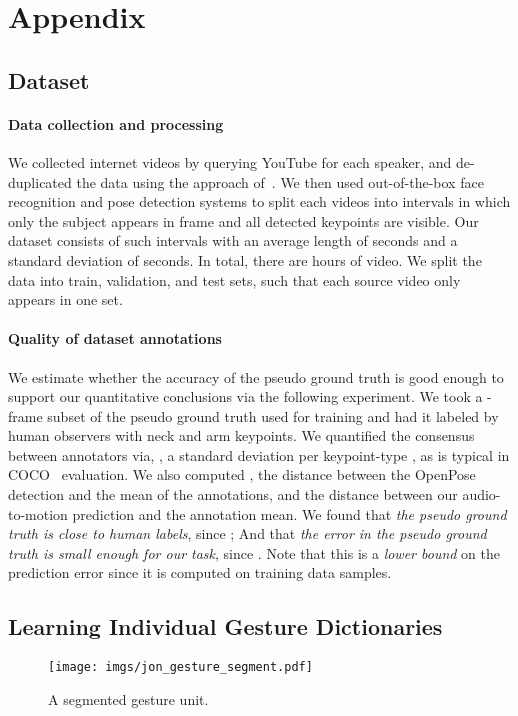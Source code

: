 \documentclass[10pt,twocolumn,letterpaper]{article}
\newcommand{\mypar}[1]{\vspace{-2mm}\paragraph{#1}}
\begin{document}
{\small


}

\section{Appendix}
\subsection{Dataset}
\paragraph{Data collection and processing}  We collected internet videos by querying YouTube for each speaker, and de-duplicated the data using the approach of~\cite{fouhey2017lifestyle}. We then used out-of-the-box face recognition and pose detection systems to split each videos into intervals in which only the subject appears in frame and all detected keypoints are visible. Our dataset consists of  such intervals with an average length of  seconds and a standard deviation of  seconds. In total, there are  hours of video. We split the data into  train,  validation, and  test sets, such that each source video only appears in one set.

\mypar{Quality of dataset annotations} We estimate whether the accuracy of the pseudo ground truth is good enough to support our quantitative conclusions via the following experiment.
We took a -frame subset of the pseudo ground truth used for training and had it labeled by  human observers with neck and arm keypoints. We quantified the consensus between annotators via, , a standard deviation per keypoint-type , as is typical in COCO~\cite{coco} evaluation. We also computed , the distance between the OpenPose detection and the mean of the annotations, and  the distance between our audio-to-motion prediction and the annotation mean. We found that \emph{the pseudo ground truth is close to human labels}, since ; And that \emph{the error in the pseudo ground truth is small enough for our task}, since . Note that this is a \emph{lower bound} on the prediction error since it is computed on training data samples.











\subsection{Learning Individual Gesture Dictionaries}
\begin{figure}
  \centering \texttt{[image: imgs/jon\_gesture\_segment.pdf]}
  \caption{A segmented gesture unit.}
  \label{fig:example-gesture}
\end{figure}
\end{document}

